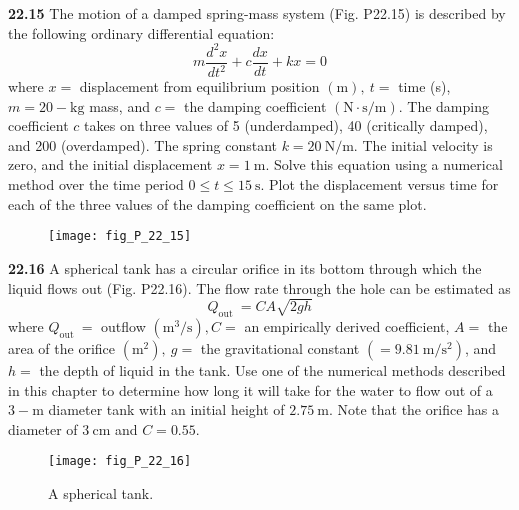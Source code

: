 \documentclass[../main.tex]{subfiles}
\begin{document}
    \begin{multicols}{2}

    \noindent\textbf{22.15} The motion of a damped spring-mass system (Fig. P22.15) is described by the following ordinary differential equation:
    $$
    m \frac{d^{2} x}{d t^{2}}+c \frac{d x}{d t}+k x=0
    $$
    where $x=$ displacement from equilibrium position $(\mathrm{m}),\ t=$ time (s), $m=20-\mathrm{kg}$ mass, and $c=$ the damping coefficient $(\mathrm{N} \cdot \mathrm{s} / \mathrm{m})$. The damping coefficient $c$ takes on three values of 5 (underdamped), 40 (critically damped), and 200 (overdamped). The spring constant $k=20 \mathrm{~N} / \mathrm{m}$.
    The initial velocity is zero, and the initial displacement $x=1 \mathrm{~m}$. Solve this equation using a numerical method over the time period $0 \leq t \leq 15 \mathrm{~s}$. Plot the displacement versus time for each of the three values of the damping coefficient on the same plot.
    
    \begin{figure}[H]
        \centering
        \texttt{[image: fig\_P\_22\_15]}
        \caption{\textsf{}}
        \label{fig:fig_P_22_15}
    \end{figure}\vspace{2mm}

    \noindent\textbf{22.16} A spherical tank has a circular orifice in its bottom through which the liquid flows out (Fig. P22.16). The flow rate through the hole can be estimated as
    $$
    Q_{\text {out }}=C A \sqrt{2 g h}
    $$
    where $Q_{\text {out }}=$ outflow $\left(\mathrm{m}^{3} / \mathrm{s}\right), C=$ an empirically derived coefficient, $A=$ the area of the orifice $\left(\mathrm{m}^{2}\right),\ g=$ the gravitational constant $\left(=9.81 \mathrm{~m} / \mathrm{s}^{2}\right)$, and $h=$ the depth of liquid in the tank.
    Use one of the numerical methods described in this chapter to determine how long it will take for the water to flow out of a $3-\mathrm{m}$ diameter tank with an initial height of $2.75 \mathrm{~m}$. Note that the orifice has a diameter of $3 \mathrm{~cm}$ and $C=0.55$.
    
    \begin{figure}[H]
        \centering
        \texttt{[image: fig\_P\_22\_16]}
       \caption{\textsf{A spherical tank.}}\label{fig:fig_P_22_16}
    \end{figure}\vspace{2mm}


\end{multicols}
\end{document}
